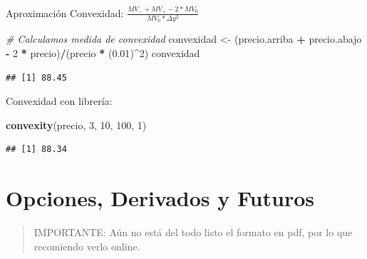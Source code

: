 \documentclass[12pt,]{book}
\newenvironment{Shaded}{\begin{snugshade}}{\end{snugshade}}
\newcommand{\KeywordTok}[1]{\textcolor[rgb]{0.13,0.29,0.53}{\textbf{#1}}}
\newcommand{\DecValTok}[1]{\textcolor[rgb]{0.00,0.00,0.81}{#1}}
\newcommand{\FloatTok}[1]{\textcolor[rgb]{0.00,0.00,0.81}{#1}}
\newcommand{\StringTok}[1]{\textcolor[rgb]{0.31,0.60,0.02}{#1}}
\newcommand{\CommentTok}[1]{\textcolor[rgb]{0.56,0.35,0.01}{\textit{#1}}}
\newcommand{\OperatorTok}[1]{\textcolor[rgb]{0.81,0.36,0.00}{\textbf{#1}}}
\newcommand{\NormalTok}[1]{#1}
\begin{document}
\vspace{8pt}

\begin{center}

Aproximación Convexidad: $\frac{MV_{-}+MV_{+}-2*MV_{0}}{MV_{0}*\Delta y^2}$ 

\end{center}

\vspace{8pt}

\begin{Shaded}
\begin{Highlighting}[]
\CommentTok{# Calculamos medida de convexidad}
\NormalTok{convexidad <-}\StringTok{ }\NormalTok{(precio.arriba }\OperatorTok{+}\StringTok{ }\NormalTok{precio.abajo  }\OperatorTok{-}\StringTok{ }\DecValTok{2} \OperatorTok{*}\StringTok{ }\NormalTok{precio)}\OperatorTok{/}\NormalTok{(precio }\OperatorTok{*}\StringTok{ }\NormalTok{(}\FloatTok{0.01}\NormalTok{)}\OperatorTok{^}\DecValTok{2}\NormalTok{)}
\NormalTok{convexidad}
\end{Highlighting}
\end{Shaded}

\begin{verbatim}
## [1] 88.45
\end{verbatim}

Convexidad con librería:

\begin{Shaded}
\begin{Highlighting}[]
\KeywordTok{convexity}\NormalTok{(precio, }\DecValTok{3}\NormalTok{, }\DecValTok{10}\NormalTok{, }\DecValTok{100}\NormalTok{, }\DecValTok{1}\NormalTok{)}
\end{Highlighting}
\end{Shaded}

\begin{verbatim}
## [1] 88.34
\end{verbatim}

\chapter{Opciones, Derivados y Futuros}\label{options}

\begin{quote}
IMPORTANTE: Aún no está del todo listo el formato en pdf, por lo que
recomiendo verlo online.
\end{quote}


\end{document}
